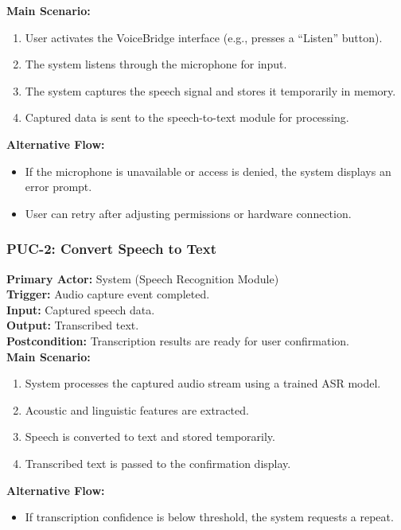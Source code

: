 \documentclass[11pt]{article}
\begin{document}
\textbf{Main Scenario:}
\begin{enumerate}
  \item User activates the VoiceBridge interface (e.g., presses a “Listen” button).
  \item The system listens through the microphone for input.
  \item The system captures the speech signal and stores it temporarily in memory.
  \item Captured data is sent to the speech-to-text module for processing.
\end{enumerate}

\textbf{Alternative Flow:}
\begin{itemize}
  \item If the microphone is unavailable or access is denied, the system displays an error prompt.
  \item User can retry after adjusting permissions or hardware connection.
\end{itemize}

\bigskip

\subsubsection*{PUC-2: Convert Speech to Text}
\textbf{Primary Actor:} System (Speech Recognition Module) \\
\textbf{Trigger:} Audio capture event completed. \\
\textbf{Input:} Captured speech data. \\
\textbf{Output:} Transcribed text. \\
\textbf{Postcondition:} Transcription results are ready for user confirmation. \\

\textbf{Main Scenario:}
\begin{enumerate}
  \item System processes the captured audio stream using a trained ASR model.
  \item Acoustic and linguistic features are extracted.
  \item Speech is converted to text and stored temporarily.
  \item Transcribed text is passed to the confirmation display.
\end{enumerate}

\textbf{Alternative Flow:}
\begin{itemize}
  \item If transcription confidence is below threshold, the system requests a repeat.
\end{itemize}
\end{document}
